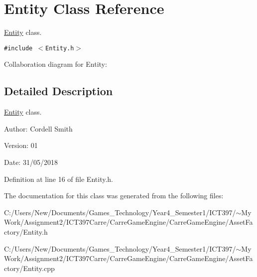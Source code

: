 \hypertarget{class_entity}{
\section{Entity Class Reference}
\label{class_entity}
}
\hyperlink{class_entity}{Entity} class.  


{\tt \#include $<$Entity.h$>$}

Collaboration diagram for Entity:

\subsection{Detailed Description}
\hyperlink{class_entity}{Entity} class. 

\begin{Desc}
\item[Author:]Cordell Smith \end{Desc}
\begin{Desc}
\item[Version:]01 \end{Desc}
\begin{Desc}
\item[Date:]31/05/2018 \end{Desc}


Definition at line 16 of file Entity.h.

The documentation for this class was generated from the following files:\begin{CompactItemize}
\item 
C:/Users/New/Documents/Games\_\-Technology/Year4\_\-Semester1/ICT397/$\sim$My Work/Assignment2/ICT397Carre/CarreGameEngine/CarreGameEngine/AssetFactory/Entity.h\item 
C:/Users/New/Documents/Games\_\-Technology/Year4\_\-Semester1/ICT397/$\sim$My Work/Assignment2/ICT397Carre/CarreGameEngine/CarreGameEngine/AssetFactory/Entity.cpp\end{CompactItemize}

